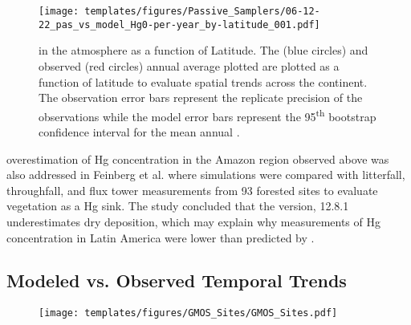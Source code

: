 \begin{figure}[H]
  \texttt{[image: templates/figures/Passive\_Samplers/06-12-22\_pas\_vs\_model\_Hg0-per-year\_by-latitude\_001.pdf]}
  \caption{\hg in the atmosphere as a function of Latitude. The \on (blue circles) and observed (red circles) annual average \hg plotted are plotted as a function of latitude to evaluate spatial trends across the continent. The observation error bars represent the replicate precision of the observations while the model error bars represent the 95\textsuperscript{th} bootstrap confidence interval for the mean annual \hg.}
  \label{fig:06-12-22_pas_vs_model_Hg0-per-year_by-latitude_001}
  \centering
  
\end{figure}
\FloatBarrier
\begin{flushleft}
    \gcs overestimation of Hg concentration in the Amazon region observed above was also addressed in Feinberg et al.\cite{feinberg_evaluating_2022}  where \gc simulations were compared with litterfall, throughfall, and flux tower measurements from 93 forested sites to evaluate vegetation as a Hg sink. The study concluded that the \gc version, 12.8.1 underestimates \hg dry deposition, which may explain why measurements of Hg concentration in Latin America were lower than predicted by \gc. 

\end{flushleft}


\subsection{Modeled vs. Observed Temporal Trends}\label{c2_modeled_vs_observed_trends}
\begin{figure}[H]
\texttt{[image: templates/figures/GMOS\_Sites/GMOS\_Sites.pdf]}
\centering
{}
\label{fig:GMOSvsGC}
\end{figure}
\FloatBarrier


